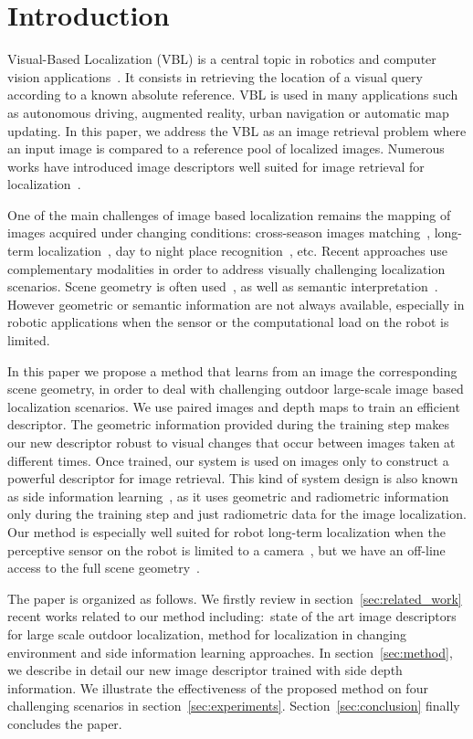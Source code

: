 \section{Introduction}
\label{sec:intro}

Visual-Based Localization (VBL) is a central topic in robotics and computer vision applications~\cite{Piasco2017}. It consists in retrieving the location of a visual query according to a known absolute reference. VBL is used in many applications such as autonomous driving, augmented reality, urban navigation or automatic map updating. In this paper, we address the VBL as an image retrieval problem where an input image is compared to a reference pool of localized images. Numerous works have introduced image descriptors well suited for image retrieval for localization~\cite{Arandjelovic2017,Kim2017a,Gordo2017,Radenovic2017,Liu2018}. 

One of the main challenges of image based localization remains the mapping of images acquired under changing conditions: cross-season images matching~\cite{Naseer2017a}, long-term localization~\cite{Toft2018}, day to night place recognition~\cite{Torii2015}, etc. Recent approaches use complementary modalities in order to address visually challenging localization scenarios. Scene geometry is often used~\cite{Sattler2018, Schonberger2018}, as well as semantic interpretation~\cite{Ardeshir2014,Christie2016,Naseer2017a}. However geometric or semantic information are not always available, especially in robotic applications when the sensor or the computational load on the robot is limited.

In this paper we propose a method that learns from an image the corresponding scene geometry, in order to deal with challenging outdoor large-scale image based localization scenarios. We use paired images and depth maps to train an efficient descriptor. The geometric information provided during the training step makes our new descriptor robust to visual changes that occur between images taken at different times. Once trained, our system is used on images only to construct a powerful descriptor for image retrieval. This kind of system design is also known as side information learning~\cite{Hoffman2016}, as it uses geometric and radiometric information only during the training step and just radiometric data for the image localization. Our method is especially well suited for robot long-term localization when the perceptive sensor on the robot is limited to a camera~\cite{Middelberg2014}, but we have an off-line access to the full scene geometry~\cite{Paparoditis2012,Maddern2016,Wang2016}. 

The paper is organized as follows. We firstly review in section~\ref{sec:related_work} recent works related to our method including:~state of the art image descriptors for large scale outdoor localization, method for localization in changing environment and side information learning approaches. In section~\ref{sec:method}, we describe in detail our new image descriptor trained with side depth information. We illustrate the effectiveness of the proposed method on four challenging scenarios in section~\ref{sec:experiments}. Section~\ref{sec:conclusion} finally concludes the paper.